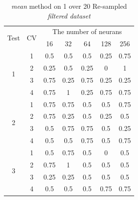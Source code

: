 \documentclass[draft,dvipsnames]{drexel-thesis}
\begin{document}
\begin{thesis}
\begin{table}[!t]
\centering
\caption{{\em mean} method on 1 over 20 Re-sampled {\em filtered dataset}}
\label{tbl:mean_1_20}
\begin{tabular}{|c|c|c|c|c|c|c|}
\hline
\multirow{2}{*}{Test} & \multirow{2}{*}{CV} & \multicolumn{5}{c|}{The number of neurans}                           \\ \cline{3-7} 
                      &                     & 16       & 32           & 64           & 128          & 256          \\ \hline
\multirow{4}{*}{1}    & 1                   & 0.5      & 0.5          & 0.5          & 0.25         & 0.75         \\ \cline{2-7} 
                      & 2                   & 0.25     & 0.5          & 0.25         & 0            & 1            \\ \cline{2-7} 
                      & 3                   & 0.75     & 0.25         & 0.75         & 0.25         & 0.25         \\ \cline{2-7} 
                      & 4                   & 0.75     & 1            & 0.25         & 0.75         & 0.75         \\ \hline
\multirow{4}{*}{2}    & 1                   & 0.75     & 0.75         & 0.5          & 0.5          & 0.75         \\ \cline{2-7} 
                      & 2                   & 0.75     & 0.25         & 0.5          & 0.25         & 0.5          \\ \cline{2-7} 
                      & 3                   & 0.5      & 0.75         & 0.75         & 0.5          & 0.25         \\ \cline{2-7} 
                      & 4                   & 0.5      & 0.5          & 0.75         & 0.5          & 0.75         \\ \hline
\multirow{4}{*}{3}    & 1                   & 0.5      & 0.75         & 0.5          & 0            & 0.5          \\ \cline{2-7} 
                      & 2                   & 0.75     & 1            & 0.5          & 0.5          & 0.5          \\ \cline{2-7} 
                      & 3                   & 0.25     & 0.25         & 0.5          & 0.5          & 0.5          \\ \cline{2-7} 
                      & 4                   & 0.5      & 0.5          & 0.5          & 0.75         & 0.75         \\ \hline

\end{tabular}
\end{table}
\end{thesis}
\end{document}

